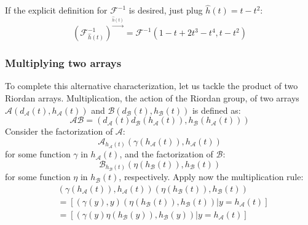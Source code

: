 \documentclass[11pt,a4paper]{article} %
\begin{document}
    If the explicit definition for $\mathcal{F}^{-1}$ is desired, just plug $\hat{h}(t)=t-t^2$:
    \begin{displaymath}
        \left(\mathcal{F}_{\hat{h}(t)}^{-1}\right)^{\stackrel{\hat{h}(t)}{\rightarrow}} =
            \mathcal{F}^{-1}\left(1-t+2t^3-t^4,t-t^2\right)
    \end{displaymath}

    \subsubsection{Multiplying two arrays}
    
    To complete this alternative characterization, let us tackle the product of
    two Riordan arrays. Multiplication, the action of the Riordan group, of two arrays
    $\mathcal{A}(d_{\mathcal{A}}(t), h_{\mathcal{A}}(t))$ and 
    $\mathcal{B}(d_{\mathcal{B}}(t), h_{\mathcal{B}}(t))$ is defined as:
    \begin{displaymath}
        \mathcal{A}\mathcal{B} = \left(d_{\mathcal{A}}(t)d_{\mathcal{B}}(h_{\mathcal{A}}(t)),
            h_{\mathcal{B}}(h_{\mathcal{A}}(t))\right)
    \end{displaymath}
    Consider the factorization of $\mathcal{A}$:
    \begin{displaymath}
        \mathcal{A}_{h_\mathcal{A}(t)} \left(\gamma(h_{\mathcal{A}}(t)), h_{\mathcal{A}}(t)  \right)
    \end{displaymath}
    for some function $\gamma $ in $h_{\mathcal{A}}(t)$, and the factorization of $\mathcal{B}$:
    \begin{displaymath}
        \mathcal{B}_{h_\mathcal{B}(t)} \left(\eta(h_{\mathcal{B}}(t)), h_{\mathcal{B}}(t)  \right)
    \end{displaymath}
    for some function $\eta $ in $h_{\mathcal{B}}(t)$, respectively. Apply now the multiplication rule:
    \begin{displaymath}
        \begin{split}
            & \left(\gamma(h_{\mathcal{A}}(t)), h_{\mathcal{A}}(t)  \right)
                \left(\eta(h_{\mathcal{B}}(t)), h_{\mathcal{B}}(t)  \right) \\
            &=\left[\left.\left(\gamma(y), y  \right)
                \left(\eta(h_{\mathcal{B}}(t)), h_{\mathcal{B}}(t)  \right) \right| y=h_{\mathcal{A}}(t) \right]\\
            &=\left[\left.\left(\gamma(y)\eta(h_{\mathcal{B}}(y)), h_{\mathcal{B}}(y)  \right) \right|
                 y=h_{\mathcal{A}}(t) \right]\\
        \end{split}
    \end{displaymath}
\end{document}
